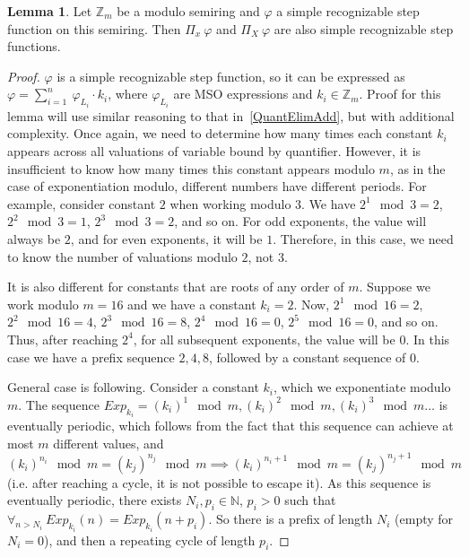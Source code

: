 \documentclass[12pt]{article}
\theoremstyle{definition}
\newtheorem{lemma}[theorem]{Lemma}
\begin{document}
\begin{lemma}
    \label{QuantElimMult}
    Let $\mathbb{Z}_m$ be a modulo semiring and $\varphi$ a simple recognizable step function on this semiring. Then $\Pi_x \ \varphi$ and $\Pi_X \ \varphi$ are also simple recognizable step functions.
\end{lemma}

\begin{proof}
    $\varphi$ is a simple recognizable step function, so it can be expressed as $\varphi = \sum_{i = 1}^{n} \ \varphi_{L_i} \cdot k_i$, where $\varphi_{L_i}$ are MSO expressions and $k_i \in \mathbb{Z}_m$. Proof for this lemma will use similar reasoning to that in~\cref{QuantElimAdd}, but with additional complexity. Once again, we need to determine how many times each constant $k_i$ appears across all valuations of variable bound by quantifier. However, it is insufficient to know how many times this constant appears modulo $m$, as in the case of exponentiation modulo, different numbers have different periods. For example, consider constant $2$ when working modulo $3$. We have $2^1 \mod 3 = 2$, $2^2 \mod 3 = 1$, $2^3 \mod 3 = 2$, and so on. For odd exponents, the value will always be $2$, and for even exponents, it will be $1$. Therefore, in this case, we need to know the number of valuations modulo $2$, not $3$. 

    It is also different for constants that are roots of any order of $m$. Suppose we work modulo $m = 16$ and we have a constant $k_i = 2$. Now, $2^1 \mod 16 = 2$, $2^2 \mod 16 = 4$, $2^3 \mod 16 = 8$, $2^4 \mod 16 = 0$, $2^5 \mod 16 = 0$, and so on. Thus, after reaching $2^4$, for all subsequent exponents, the value will be $0$. In this case we have a prefix sequence $2,4,8$, followed by a constant sequence of $0$.

    General case is following. Consider a constant $k_i$, which we exponentiate modulo $m$. The sequence $Exp_{k_i} = (k_i)^1 \mod m, (k_i)^2 \mod m, (k_i)^3 \mod m \ldots$ is eventually periodic, which follows from the fact that this sequence can achieve at most $m$ different values, and $(k_i)^{n_i} \mod m = (k_j)^{n_j} \mod m \implies (k_i)^{n_i + 1} \mod m = (k_j)^{n_j + 1} \mod m$ (i.e. after reaching a cycle, it is not possible to escape it). As this sequence is eventually periodic, there exists $N_i, p_i \in \mathbb{N}$, $p_i > 0$ such that $\forall_{n > N_i} \ Exp_{k_i}(n) = Exp_{k_i}(n + p_i)$. So there is a prefix of length $N_i$ (empty for $N_i = 0$), and then a repeating cycle of length $p_i$. 


\end{proof}
\end{document}

